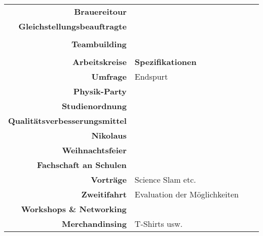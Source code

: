\documentclass[a4paper, 14pt]{article}
\begin{document}
\begin{table}[h!]
{\begin{tabular}{r||p{5.5cm}||ll}
			\textbf{Brauereitour} & &  &  \\
			\textbf{Gleichstellungsbeauftragte} & &  &    \\ 
			& &  &  \\
			\textbf{Teambuilding }& & &  \\ 
			& &  &  \\\hline \hline
			\textbf{Arbeitskreise} & \textbf{Spezifikationen} &   \\ \hline \hline
			\textbf{Umfrage} & Endspurt &   \\
			\textbf{Physik-Party} & &   \\
			\textbf{Studienordnung} & &   \\
			\textbf{Qualitätsverbesserungsmittel} & &  &  \\
			\textbf{Nikolaus} & &  &  \\
			\textbf{Weihnachtsfeier} & &  &  \\
			\textbf{Fachschaft an Schulen} & &  &  \\
			\textbf{Vorträge} & Science Slam etc. &  &  \\
			\textbf{\glqq Zweitifahrt\grqq} & Evaluation der Möglichkeiten &  &  \\
			\textbf{Workshops \& Networking}& &  \\
			\textbf{Merchandinsing}& T-Shirts usw. &  \\ \hline\hline
		\end{tabular}
	}
	\end{table}
\end{document}
